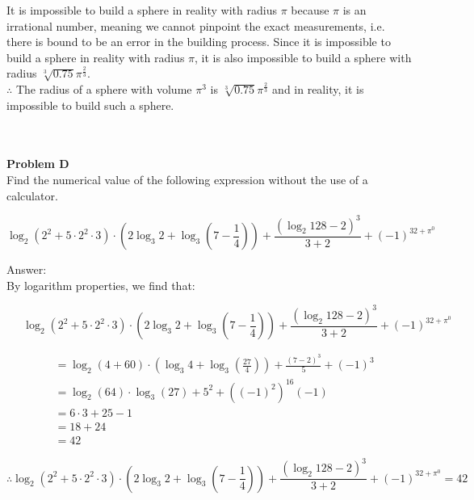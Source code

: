 \documentclass[12pt, letterpaper]{report}
\begin{document}
It is impossible to build a sphere in reality with radius $\pi$ because $\pi$ is an irrational number, meaning we cannot pinpoint the exact measurements, i.e. there is bound to be an error in the building process. Since it is impossible to build a sphere in reality with radius $\pi$, it is also impossible to build a sphere with radius $\sqrt[3]{0.75}\pi^{\frac{2}{3}}$.\\

$\therefore$ The radius of a sphere with volume $\pi^3$ is $\sqrt[3]{0.75}\pi^{\frac{2}{3}}$ and in reality, it is impossible to build such a sphere.

\makebox[\linewidth]{\rule{\textwidth}{0.4pt}}\\
\\\textbf{Problem D}\\
Find the numerical value of the following expression without the use of a calculator.

\begin{equation*}
\log_2(2^2 + 5\cdot 2^2 \cdot 3) \cdot (2 \log_3{2} + \log_3(7-\frac{1}{4})) + \frac{(\log_2{128} - 2)^3}{3 + 2} + (-1)^{32 + \pi^0}
\end{equation*}

\bigskip

Answer:\\
By logarithm properties, we find that:

\begin{fleqn}
\begin{equation*}
\quad\>\>\log_2(2^2 + 5 \cdot 2^2 \cdot 3) \cdot (2 \log_3{2} + \log_3(7-\frac{1}{4})) + \frac{(\log_2{128} - 2)^3}{3 + 2} + (-1)^{32 + \pi^0}
\end{equation*}

\begin{align*}
	&= \log_2(4 + 60)\cdot (\log_3{4} + \log_3(\frac{27}{4})) + \frac{(7 - 2)^3}{5} + (-1)^3 \\
	&= \log_2(64) \cdot \log_3(27) + 5^2 + ((-1)^2)^{16}(-1) \\
	&= 6\cdot 3 + 25 - 1 \\
	&= 18 + 24 \\
	&= 42
\end{align*}

\begin{equation*}
\therefore \log_2(2^2 + 5\cdot 2^2 \cdot 3) \cdot (2 \log_3{2} + \log_3(7-\frac{1}{4})) + \frac{(\log_2{128} - 2)^3}{3 + 2} + (-1)^{32 + \pi^0} = 42
\end{equation*}
\end{fleqn}
\end{document}
